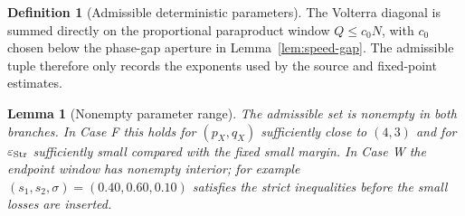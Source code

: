 \documentclass[10pt]{amsart}
\numberwithin{equation}{section}
\theoremstyle{plain}
\newtheorem{lemma}[theorem]{Lemma}
\theoremstyle{definition}
\newtheorem{definition}[theorem]{Definition}
\theoremstyle{remark}
\newcommand{\eps}{\varepsilon}
\begin{document}
\begin{definition}[Admissible deterministic parameters]
The Volterra diagonal is summed directly on the proportional paraproduct window $Q\le c_0N$, with $c_0$ chosen below the phase-gap aperture in Lemma~\ref{lem:speed-gap}.  The admissible tuple therefore only records the exponents used by the source and fixed-point estimates.
\end{definition}

\begin{lemma}[Nonempty parameter range]\label{lem:parameter-range}
The admissible set is nonempty in both branches.  In Case F this holds for $(p_X,q_X)$ sufficiently close to $(4,3)$ and for $\eps_{\rm Str}$ sufficiently small compared with the fixed small margin.  In Case W the endpoint window has nonempty interior; for example $(s_1,s_2,\sigma)=(0.40,0.60,0.10)$ satisfies the strict inequalities before the small losses are inserted.
\end{lemma}
\end{document}
